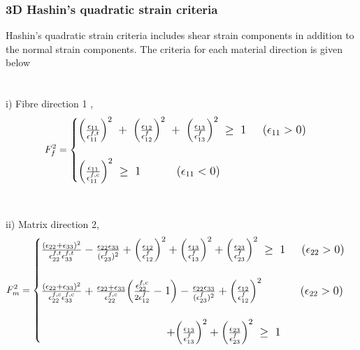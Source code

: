 \documentclass[a4paper,12pt]{extarticle}
\begin{document}
\subsubsection{3D Hashin's quadratic strain criteria}
\indent\indent\indent Hashin's quadratic strain criteria includes shear strain components in addition to the normal strain components. The criteria for each material direction is given below\\
\\
\\
i) Fibre direction 1 ,
\\
\begin{equation}
\large{F_{f}^{2} =  
	\begin{cases}
	
		\Big(\frac{\epsilon_{11}}{\epsilon_{11}^{f,t}}\Big)^{2} \; + \; \Big(\frac{\epsilon_{12}}{\epsilon_{12}^{f}}\Big)^{2} \; + \; \Big(\frac{\epsilon_{13}}{\epsilon_{13}^{f}}\Big)^{2} \; \geq  \; 1  \; \; \; \; \;  (\epsilon_{11}  >  0)  \\
	\\
	\Big(\frac{\epsilon_{11}}{\epsilon_{11}^{f,c}}\Big)^{2}  \; \geq  \; 1 \; \; \; \; \; \; \;  \; \; \; \;  (\epsilon_{11}  <  0) 

	
	\end{cases}}
\end{equation}
\\
\\
ii) Matrix direction 2,
\\
\begin{equation}
\large{F_{m}^{2} =  
	\begin{cases}
	
	\frac{(\epsilon_{22} + \epsilon_{33} )^{2}}{\epsilon_{22}^{f,t} \epsilon_{33}^{f,t}}   -  \frac{\epsilon_{22}\epsilon_{33}}{(\epsilon_{23}^{f})^{2}}  +  \Big(\frac{\epsilon_{12}}{\epsilon_{12}^{f}}\Big)^{2}  + \Big(\frac{\epsilon_{13}}{\epsilon_{13}^{f}}\Big)^{2}  +  \Big(\frac{\epsilon_{23}}{\epsilon_{23}^{f}}\Big)^{2} \;\geq  \; 1 \; \; \; \; \;  (\epsilon_{22}  >  0) \\
	\\
	
	\frac{(\epsilon_{22} + \epsilon_{33} )^{2}}{\epsilon_{22}^{f,c} \epsilon_{33}^{f,c}}  +  \frac{\epsilon_{22} + \epsilon_{33}}{\epsilon_{22}^{f,c}}\Big(\frac{\epsilon_{22}^{f,c}}{2\epsilon_{12}^{f}}  -  1\Big)   -  \frac{\epsilon_{22}\epsilon_{33}}{(\epsilon_{23}^{f})^{2}}  +  \Big(\frac{\epsilon_{12}}{\epsilon_{12}^{f}}\Big)^{2}\; \; \; \; \; \; \; \; \; \; \; \;  (\epsilon_{22}  >  0) \\ 
\\	
	\; \; \; \; \; \; \; \;\; \; \; \; \; \; \; \;\; \; \; \; \; \; \; \;  \; \;\; \; \; \; \; \; \; \;\; \; \; \; \;  + \Big(\frac{\epsilon_{13}}{\epsilon_{13}^{f}}\Big)^{2}   +  \Big(\frac{\epsilon_{23}}{\epsilon_{23}^{f}}\Big)^{2} \;\geq \; 1 
	
	
	\end{cases}}
\end{equation}
\end{document}
